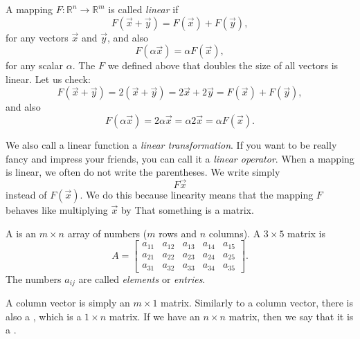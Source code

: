 A mapping $F \colon {\mathbb R}^n \to {\mathbb R}^m$
is called \emph{linear} if
\begin{equation*}
F(\vec{x}+\vec{y}) = F(\vec{x})+F(\vec{y}),
\end{equation*}
for any vectors $\vec{x}$ and $\vec{y}$,
and also
\begin{equation*}
F(\alpha \vec{x}) = \alpha F(\vec{x}) ,
\end{equation*}
for any scalar $\alpha$.
The $F$ we defined above that doubles the size of all vectors is linear.  Let
us check:
\begin{equation*}
F(\vec{x}+\vec{y})
=
2(\vec{x}+\vec{y})
=
2\vec{x}+2\vec{y}
=
F(\vec{x})+F(\vec{y}) ,
\end{equation*}
and also
\begin{equation*}
F(\alpha \vec{x}) = 2 \alpha \vec{x} = \alpha 2 \vec{x} = \alpha F(\vec{x}) .
\end{equation*}

We also call a linear function a
\emph{linear transformation}.
If you want to be really fancy and impress your friends, you can call it a
\emph{linear operator}.
When a mapping is linear, we often do not write the parentheses.  We write
simply
\begin{equation*}
F \vec{x}
\end{equation*}
instead of $F(\vec{x})$.  We do this because linearity means that the
mapping $F$
behaves like multiplying $\vec{x}$ by 
That something is a matrix.

A \emph{}
is an $m
\times n$ array of numbers ($m$ rows and $n$ columns).  A
$3 \times 5$ matrix is
\begin{equation*}
A =
\begin{bmatrix}
a_{11} & a_{12} & a_{13} & a_{14} & a_{15} \\
a_{21} & a_{22} & a_{23} & a_{24} & a_{25} \\
a_{31} & a_{32} & a_{33} & a_{34} & a_{35}
\end{bmatrix} .
\end{equation*}
The numbers $a_{ij}$ are called \emph{elements}
or \emph{entries}.

A column vector is simply an $m \times 1$ matrix.  Similarly to
a column vector, there is also a
\emph{}, which is a $1 \times n$ matrix.
If we have an $n \times n$ matrix, then we say that it is a
\emph{}.

